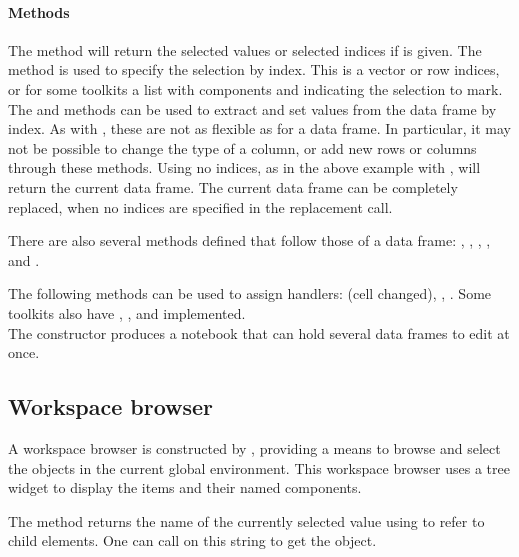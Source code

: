 \paragraph{Methods} The  method will return the
selected values or selected indices if  is given. The
 method is used to specify the selection by
index. This is a vector or row indices, or for some toolkits a list
with components  and  indicating the
selection to mark.  The \method{[}{gdf} and \method{[\ASSIGN}{gdf}
methods can be used to extract and set values from the data frame by
index. As with , these are not as flexible as for a data
frame. In particular, it may not be possible to change the type of a
column, or add new rows or columns through these methods. Using no
indices, as in the above example with , will return the
current data frame. The current data frame can be completely replaced,
when no indices are specified in the replacement call.

There are also several methods defined that follow those of a data
frame: , ,
, , and
.

The following methods can be used to assign handlers:
 (cell changed),
,
. Some toolkits also have
,
, and
 implemented.
\\


The  constructor produces a notebook that can
hold several data frames to edit at once.





\subsection{Workspace browser}
\label{sec:gWidgets-workspace-browser}

A workspace browser is constructed by , providing a
means to browse and select the objects in the current global
environment. This workspace browser uses a tree widget to display the
items and their named components.

The  method returns the name of the currently selected value
using \code{\$} to refer to child elements.  One can call
 on this string to get the \R\/ object.

